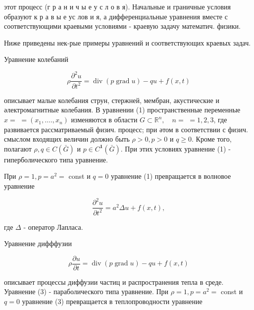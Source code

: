 \documentclass[10pt]{article}
\begin{document}
этот процесс (г р а н и ч ы е у с л о в я). Начальные и граничные условия образуют к р а в ы е ус лов и я, а дифференциальные уравнения вместе с соответствующими краевыми условиями - краевую задачу математич. физики.



Ниже приведены нек-рые примеры уравнений и соответствующих краевых задач.



Уравнение колебаний



\[

\rho \frac{\partial^{2} u}{\partial t^{2}}=\operatorname{div}(p \operatorname{grad} u)-q u+f(x, t)

\]



описывает малые колебания струн, стержней, мембран, акустические и әлектромагнитные колебания. В уравнении (1) пространственные переменные $x=$ $=\left(x_{1}, \ldots ., x_{n}\right)$ изменяются в области $G \subset \mathbb{R}^{n}, \quad n=$ $=1,2,3$, где развивается рассматриваемый физич. процесс; при әтом в соответствии с физич. смыслом входящих величин должно быть $\rho>0, p>0$ и $q \geqslant 0$. Кроме того, полагают $\rho, q \in C(\bar{G})$ и $p \in C^{\mathbf{1}}(\bar{G})$. При этих условиях уравнение (1) - гиперболического типа уравнение.



При $\rho=1, p=a^{2}=$ const и $q=0$ уравнение (1) превращается в волновое уравнение



\[

\frac{\partial^{2} u}{\partial t^{2}}=a^{2} \Delta u+f(x, t),

\]



где $\Delta$ - оператор Лапласа.



Уравнение дифффузии



\[

\rho \frac{\partial u}{\partial t}=\operatorname{div}(p \operatorname{grad} u)-q u+f(x, t)

\]



описывает процессы диффузии частиц и распространения тепла в среде. Уравнение (3) - параболического типа уравнение. При $\rho=1, p=a^{2}=$ const и $q=0$ уравнение (3) превращается в теплопроводности уравнение
\end{document}
